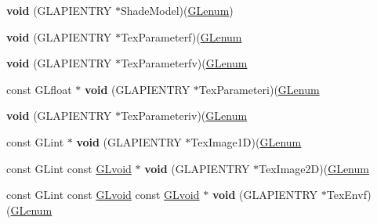 \begin{DoxyCompactItemize}
{\bfseries void} (G\+L\+A\+P\+I\+E\+N\+T\+RY $\ast$Shade\+Model)(\hyperlink{interfacevoid}{G\+Lenum})
\item 
\mbox{\label{struct_____g_ldispatch_table_rec_a6ff76e5d7cd13657723901979edd12d9}} 
{\bfseries void} (G\+L\+A\+P\+I\+E\+N\+T\+RY $\ast$Tex\+Parameterf)(\hyperlink{interfacevoid}{G\+Lenum}
\item 
\mbox{\label{struct_____g_ldispatch_table_rec_a8e22fca20449533f3b0c634f299cc202}} 
{\bfseries void} (G\+L\+A\+P\+I\+E\+N\+T\+RY $\ast$Tex\+Parameterfv)(\hyperlink{interfacevoid}{G\+Lenum}
\item 
\mbox{\label{struct_____g_ldispatch_table_rec_aae36ab600e81e984fc9a4b5bfb87f2af}} 
const G\+Lfloat $\ast$ {\bfseries void} (G\+L\+A\+P\+I\+E\+N\+T\+RY $\ast$Tex\+Parameteri)(\hyperlink{interfacevoid}{G\+Lenum}
\item 
\mbox{\label{struct_____g_ldispatch_table_rec_abeb7af4f6b70824c1c7f7d7e717ce4ac}} 
{\bfseries void} (G\+L\+A\+P\+I\+E\+N\+T\+RY $\ast$Tex\+Parameteriv)(\hyperlink{interfacevoid}{G\+Lenum}
\item 
\mbox{\label{struct_____g_ldispatch_table_rec_ac44071070670dc3bc1be9ac729680bda}} 
const G\+Lint $\ast$ {\bfseries void} (G\+L\+A\+P\+I\+E\+N\+T\+RY $\ast$Tex\+Image1D)(\hyperlink{interfacevoid}{G\+Lenum}
\item 
\mbox{\label{struct_____g_ldispatch_table_rec_a496350f3d1098578887f033426006c3d}} 
const G\+Lint const \hyperlink{interfacevoid}{G\+Lvoid} $\ast$ {\bfseries void} (G\+L\+A\+P\+I\+E\+N\+T\+RY $\ast$Tex\+Image2D)(\hyperlink{interfacevoid}{G\+Lenum}
\item 
\mbox{\label{struct_____g_ldispatch_table_rec_acd1170feb59de5aba4ab5d3c348e48c5}} 
const G\+Lint const \hyperlink{interfacevoid}{G\+Lvoid} const \hyperlink{interfacevoid}{G\+Lvoid} $\ast$ {\bfseries void} (G\+L\+A\+P\+I\+E\+N\+T\+RY $\ast$Tex\+Envf)(\hyperlink{interfacevoid}{G\+Lenum}
\item 
\mbox{\label{struct_____g_ldispatch_table_rec_a055503fa62beb8b5cc535e98dfca9368}} 

\end{DoxyCompactItemize}
